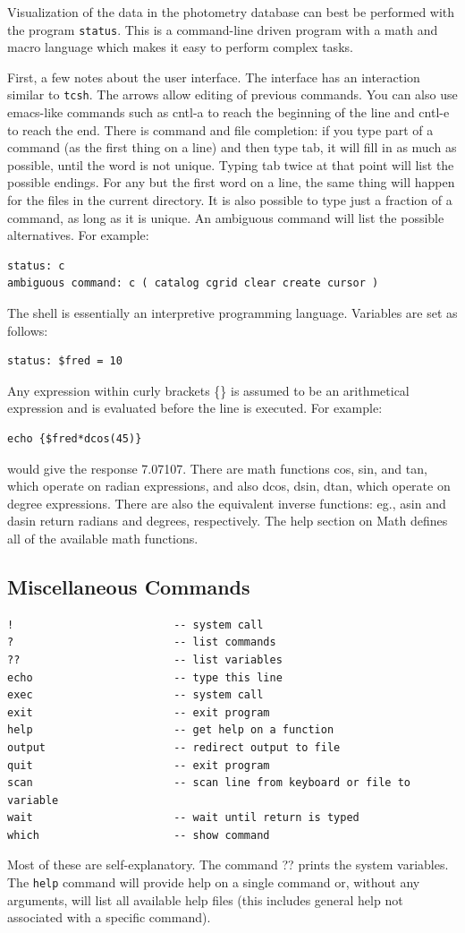 \documentclass{article}
\begin{document}
Visualization of the data in the photometry database can best be
performed with the program {\tt status}.  This is a command-line
driven program with a math and macro language which makes it easy to
perform complex tasks.  

First, a few notes about the user interface.  The interface has an
interaction similar to {\tt tcsh}.  The arrows allow editing of
previous commands.  You can also use emacs-like commands such as
cntl-a to reach the beginning of the line and cntl-e to reach the end.
There is command and file completion: if you type part of a command
(as the first thing on a line) and then type tab, it will fill in as
much as possible, until the word is not unique.  Typing tab twice at
that point will list the possible endings.  For any but the first word
on a line, the same thing will happen for the files in the current
directory.  It is also possible to type just a fraction of a command,
as long as it is unique.  An ambiguous command will list the possible
alternatives.  For example:
\begin{verbatim}
status: c
ambiguous command: c ( catalog cgrid clear create cursor )
\end{verbatim}

The shell is essentially an interpretive programming language.
Variables are set as follows:
\begin{verbatim}
status: $fred = 10
\end{verbatim}
Any expression within curly brackets \{\} is assumed
to be an arithmetical expression and is evaluated before the line is
executed.  For example:
\begin{verbatim}
echo {$fred*dcos(45)}
\end{verbatim}
would give the response 7.07107.  There are math functions cos, sin,
and tan, which operate on radian expressions, and also dcos, dsin,
dtan, which operate on degree expressions.  There are also the
equivalent inverse functions: eg., asin and dasin return radians and
degrees, respectively.  The help section on Math defines all of the
available math functions.  

\subsection{Miscellaneous Commands}
\begin{verbatim}
!                         -- system call
?                         -- list commands 
??                        -- list variables 
echo                      -- type this line 
exec                      -- system call
exit                      -- exit program 
help                      -- get help on a function 
output                    -- redirect output to file
quit                      -- exit program 
scan                      -- scan line from keyboard or file to variable 
wait                      -- wait until return is typed
which                     -- show command 
\end{verbatim}
Most of these are self-explanatory.  The command ?? prints the system
variables.  The {\tt help} command will provide help on a single
command or, without any arguments, will list all available help
files (this includes general help not associated with a specific
command).  
\end{document}
